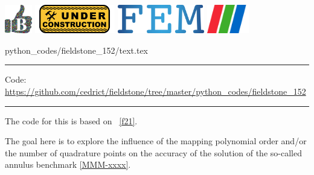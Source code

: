 \noindent
\includegraphics[height=1.25cm]{images/pictograms/benchmark}
\includegraphics[height=1.25cm]{images/pictograms/under_construction}
\includegraphics[height=1.25cm]{images/pictograms/FEM}
\includegraphics[height=1.25cm]{images/pictograms/paraview}



\begin{flushright} {\tiny {\color{gray} python\_codes/fieldstone\_152/text.tex}} \end{flushright}



\par\noindent\rule{\textwidth}{0.4pt}

\begin{center}
\inpython
{\small Code: \url{https://github.com/cedrict/fieldstone/tree/master/python_codes/fieldstone_152}}
\end{center}

\par\noindent\rule{\textwidth}{0.4pt}




The code for this \stone is based on \stone~\ref{f21}. 

The goal here is to explore the influence of the mapping polynomial order and/or
the number of quadrature points on the accuracy of the solution of the so-called 
annulus benchmark \ref{MMM-xxxx}.

